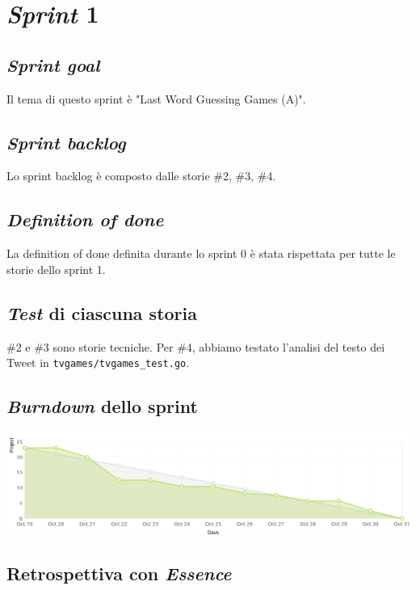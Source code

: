 \documentclass{article}
\begin{document}
\section{\emph{Sprint} 1}

\subsection{\emph{Sprint goal}}

Il tema di questo sprint è "Last Word Guessing Games (A)".

\subsection{\emph{Sprint backlog}}

Lo sprint backlog è composto dalle storie \#2, \#3, \#4.

\subsection{\emph{Definition of done}}

La definition of done definita durante lo sprint 0 è stata rispettata per tutte
le storie dello sprint 1.

\subsection{\emph{Test} di ciascuna storia}

\#2 e \#3 sono storie tecniche. Per \#4, abbiamo testato l'analisi del testo dei
Tweet in \verb!tvgames/tvgames_test.go!.

\subsection{\emph{Burndown} dello sprint}

\includegraphics[width=\textwidth]{burndown-1}

\subsection{Retrospettiva con \emph{Essence}}
\end{document}
